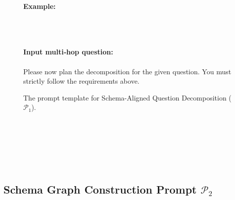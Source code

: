 \documentclass[11pt]{article}
\begin{document}
\begin{figure}[H]
\begin{tcolorbox}
    \vspace{0.3cm}
    
    \textbf{Example:} \\
    \text{[EXAMPLE\_1]} \\
    \text{[EXAMPLE\_2]} \\
    \text{[EXAMPLE\_3]} \\
    
    \vspace{0.3cm}
    
    \textbf{Input multi‑hop question:} \\
    \text{[Query]} \\
    Please now plan the decomposition for the given question. You must strictly follow the requirements above.
    
    \end{tcolorbox}
    \caption{The prompt template for Schema-Aligned Question Decomposition ($\mathcal{P}_1$).}
    \label{fig:p1}
\end{figure}

\text{} \\
\text{} \\
\text{} \\
\text{} \\
\text{} \\
\text{}


\subsection{Schema Graph Construction Prompt \hyperref[fig:p2]{$ \mathcal{P}_2 $}}
\end{document}
